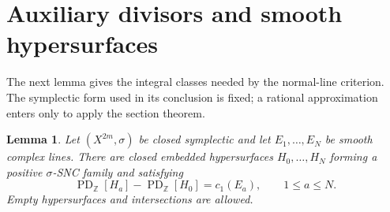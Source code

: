 \documentclass[11pt]{article}
\newtheorem{lemma}[theorem]{Lemma}
\theoremstyle{definition}
\theoremstyle{remark}
\newcommand{\Z}{\mathbb Z}
\newcommand{\PD}{\operatorname{PD}_{\Z}}
\begin{document}
\section{Auxiliary divisors and smooth hypersurfaces}\label{sec:aux}

The next lemma gives the integral classes needed by the normal-line criterion. The symplectic form used in its conclusion is fixed; a rational approximation enters only to apply the section theorem.

\begin{lemma}\label{lem:aux}
Let $(X^{2m},\sigma)$ be closed symplectic and let $E_1,\ldots,E_N$ be smooth complex lines. There are closed embedded hypersurfaces $H_0,\ldots,H_N$ forming a positive $\sigma$-SNC family and satisfying
\begin{equation}\label{eq:chern}
 \PD[H_a]-\PD[H_0]=c_1(E_a),\qquad 1\leq a\leq N.
\end{equation}
Empty hypersurfaces and intersections are allowed.
\end{lemma}
\end{document}
